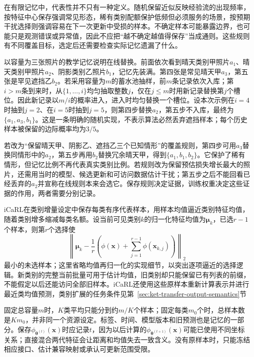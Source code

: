 在有限记忆中，代表性并不只有一种定义。随机保留近似反映经验流的出现频率，按特征中心保存强调常见形态，稀有类别配额保护低频但必须服务的场景，按预期干扰选择则强调容易在下一次更新中受损的样本。不确定样本可能暴露边界，也可能只是观测错误或异常值，因此不应把“越不确定越值得保存”当成通则。这些规则有不同覆盖目标，选定后还需要检查实际记忆遗漏了什么。

以容量为三张照片的教学记忆说明在线替换。前面依次看到晴天类别甲照片$a_1$、晴天类别甲照片$a_2$、阴影类别乙照片$b_1$，记忆先装满。第四张是常见晴天甲$a_3$，第五张是罕见遮挡乙$b_2$。若采用容量为$m$的蓄水池抽样，前$m$条记录依次入库；第$i>m$条到来时，从$\{1,\ldots,i\}$均匀抽取整数$j$，仅在$j\leq m$时用新记录替换第$j$个槽位。因此新记录以$m/i$的概率进入，进入时均匀替换一个槽位。设本次示例在$i=4$时抽到$j=2$、在$i=5$时抽到$j=5$，则第四步替换$a_2$，第五步不入库，最终为$\{a_1,a_3,b_1\}$。这是一条明确的随机实现，不表示算法必然丢弃遮挡样本；每个历史样本被保留的边际概率均为$3/5$。

若改为“保留晴天甲、阴影乙、遮挡乙三个已知情形”的覆盖规则，第四步可用$a_3$替换同情形中的$a_2$，第五步再用$b_2$替换冗余晴天甲，得到$\{a_1,b_1,b_2\}$。它保护了稀有情形，但记忆比例不再代表真实类别比例。若规则改为保留预估损失增长最大的照片，还需用当时的模型、候选更新和可访问数据估计干扰；第五步之后不能回看已经丢弃的$a_2$并宣称在线规则本来会选它。保存规则决定证据，训练权重决定这些证据的作用，两者需要分别记录。

iCaRL在类别增量设定中保存每类有序代表样本，用样本均值逼近类别特征均值，随着类别增多缩减每类名额。设当前可见类别$k$的归一化特征均值为$\bm{\mu}_k$，已选$r-1$个样本，则第$r$个选择使
\begin{equation}
\left\lVert\bm{\mu}_k-
\frac{1}{r}\left(\phi(\bm{x})+
\sum_{j=1}^{r-1}\phi(\bm{x}_{k,j})\right)\right\rVert_2
\label{eq:ket-update-herding}
\end{equation}
最小的未选样本；这里省略均值再归一化的实现细节，以突出逐项逼近的选择逻辑。新类别的完整当前批量可用于估计均值，旧类别却只能保留已有列表的前缀，不能假定以后还能访问全部旧样本。iCaRL还使用这些原样本重新计算表示并进行最近类均值预测，类别扩展的任务条件见第~\ref{sec:ket-transfer-output-semantics}节

固定总容量$m$时，$K$类平均只能分到约$m/K$个样本；固定每类$m_0$个时，总样本数是$Km_0$，并非同一个资源设定。标签、时间、模型版本和旧预测也是记忆的一部分。保存$\phi_{\bm{\theta}^{(t)}}(\bm{x})$时应记录$t$，因为以后计算的$\phi_{\bm{\theta}^{(t+1)}}(\bm{x})$可能已使用不同坐标关系；直接混合两代特征会让距离和均值失去一致含义。没有原样本时，只能冻结相应接口、估计兼容映射或承认可更新范围受限。

